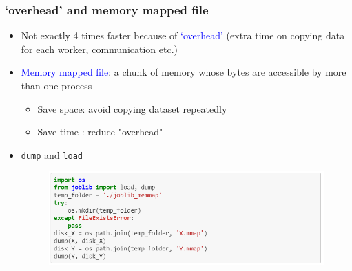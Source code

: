 \documentclass[red]{beamer}
\begin{document}
\begin{frame}
\frametitle{`overhead' and memory mapped file}
	\begin{itemize}
		\item Not exactly 4 times faster because of \textcolor{blue}{`overhead'} (extra time on copying data for each worker, communication etc.)
		\item \textcolor{blue}{Memory mapped file}:  a chunk of memory whose bytes are accessible by more than one process 
		\begin{itemize}
			\item Save space: avoid copying dataset repeatedly
			\item Save time : reduce "overhead"
		\end{itemize}
			\item \texttt{dump} and \texttt{load}
		\begin{figure}
			\centering
			\includegraphics[width=1\linewidth]{figure/screenshot030}
		\end{figure}
	\end{itemize}

\end{frame}
\end{document}
